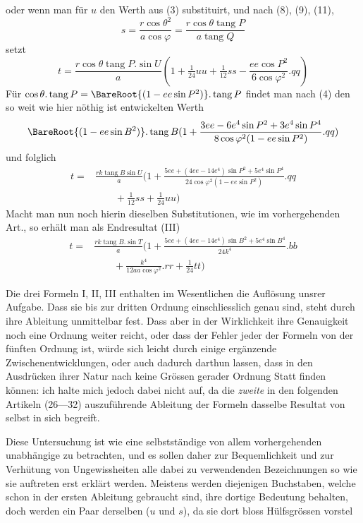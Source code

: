 %
oder wenn man für \(u\) den Werth aus (3) substituirt, und nach (8), (9), (11),
\[
s=\frac{r\cos\theta^2}{a\cos\varphi}=\frac{r\cos\theta\operatorname{tang}P}{a\operatorname{tang}Q}
\]
setzt
\[
t=\frac{r\cos\theta\operatorname{tang}P\mathord{.}\sin U}{a}(1+\tfrac1{24}uu+\tfrac1{12}ss-\frac{ee\cos P^2}{6\cos\varphi^2}\mathord{.}qq)
\]
Für \(\cos\theta\mathord{.}\operatorname{tang}P=\BareRoot{(1-ee\sin P^2)}\mathord{.}\operatorname{tang}P\) findet man nach (4) den so weit wie hier nöthig ist entwickelten Werth
\[
\BareRoot{(1-ee\sin B^2)}\mathord{.}\operatorname{tang}B(1+\frac{3ee-6e^4\sin P^2+3e^4\sin P^4}{8\cos\varphi^2(1-ee\sin P^2)}\mathord{.}qq)
\]
und folglich
\[
\begin{aligned}
t={}&\frac{rk\operatorname{tang}B\sin U}{a}(1+\frac{5ee+(4ee-14e^4)\sin P^2+5e^4\sin P^4}{24\cos\varphi^2(1-ee\sin P^2)}\mathord{.}qq\\
&\qquad+\tfrac1{12}ss+\tfrac1{24}uu)
\end{aligned}
\]
Macht man nun noch hierin dieselben Substitutionen, wie im vorhergehenden Art., so erhält man als Endresultat (III)
\[
\begin{aligned}
t={}&\frac{rk\operatorname{tang}B\mathord{.}\sin T}{a}(1+\frac{5ee+(4ee-14e^4)\sin B^2+5e^4\sin B^4}{24k^4}\mathord{.}bb\\
&\qquad+\frac{k^4}{12aa\cos\varphi^2}\mathord{.}rr+\tfrac1{24}tt)
\end{aligned}
\]

\indent Die drei Formeln I, II, III enthalten im Wesentlichen die Auflösung unsrer Aufgabe. Dass sie bis zur dritten Ordnung einschliesslich genau sind, steht durch ihre Ableitung unmittelbar fest. Dass aber in der Wirklichkeit ihre Genauigkeit noch eine Ordnung weiter reicht, oder dass der Fehler jeder der Formeln von der fünften Ordnung ist, würde sich leicht durch einige ergänzende Zwischenentwicklungen, oder auch dadurch darthun lassen, dass in den Ausdrücken ihrer Natur nach keine Grössen gerader Ordnung Statt finden können: ich halte mich jedoch dabei nicht auf, da die \textit{zweite} in den folgenden Artikeln (26---32) auszuführende Ableitung der Formeln dasselbe Resultat von selbst in sich begreift.

Diese Untersuchung ist wie eine selbstständige von allem vorhergehenden unabhängige zu betrachten, und es sollen daher zur Bequemlichkeit und zur Verhütung von Ungewissheiten alle dabei zu verwendenden Bezeichnungen so wie sie auftreten erst erklärt werden. Meistens werden diejenigen Buchstaben, welche schon in der ersten Ableitung gebraucht sind, ihre dortige Bedeutung behalten, doch werden ein Paar derselben (\(u\) und \(s\)), da sie dort bloss Hülfsgrössen vorstel%
